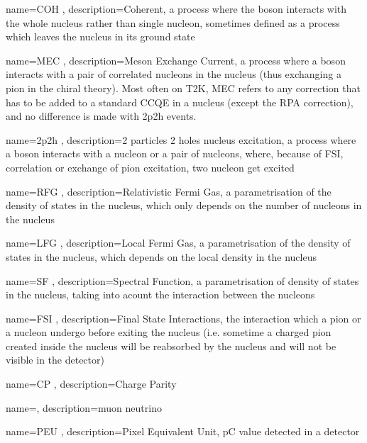  {name=COH , description={Coherent, a process
where the boson interacts with the whole nucleus rather than single
nucleon, sometimes defined as a process which leaves the nucleus in
its ground state}}

 {name=MEC , description={Meson Exchange
Current, a process where a boson interacts with a pair of correlated
nucleons in the nucleus (thus exchanging a pion in the chiral theory).
Most often on T2K, MEC refers to any correction that has to be added
to a standard CCQE in a nucleus (except the RPA correction), and no
difference is made with 2p2h events.}}

 {name=2p2h , description={2 particles 2 holes
nucleus excitation, a process where a boson interacts with a nucleon
or a pair of nucleons, where, because of FSI, correlation or exchange
of pion excitation, two nucleon get excited}}

 {name=RFG , description={Relativistic Fermi
Gas, a parametrisation of the density of states in the nucleus, which
only depends on the number of nucleons in the nucleus}}

 {name=LFG , description={Local Fermi Gas, a
parametrisation of the density of states in the nucleus, which depends
on the local density in the nucleus}}

 {name=SF , description={Spectral Function, a
parametrisation of density of states in the nucleus, taking into acount
the interaction between the nucleons}}

 {name=FSI , description={Final State
Interactions, the interaction which a pion or a nucleon undergo before
exiting the nucleus (i.e. sometime a charged pion created inside the
nucleus will be reabsorbed by the nucleus and will not be visible in
the detector)}}

 {name=CP , description={Charge Parity}}

 {name=\numu , description={muon neutrino}}

 {name=PEU , description={Pixel Equivalent Unit,
pC value detected in a detector}}



